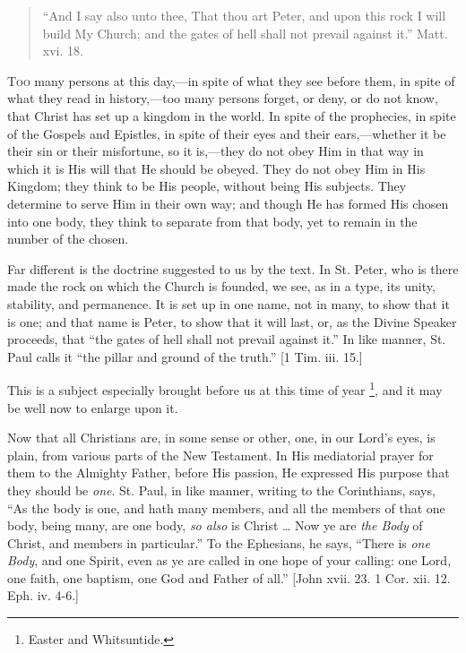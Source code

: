 
\begin{quote}

``And I say also unto thee, That thou art Peter, and upon
this rock I will build My Church; and the gates of hell shall not
prevail against it.'' Matt. xvi. 18.

\end{quote}

T\textsc{oo} many persons at this day,—in spite of what they see before
them, in spite of what they read in history,—too many persons
forget, or deny, or do not know, that Christ has set up a kingdom in
the world. In spite of the prophecies, in spite of the Gospels and
Epistles, in spite of their eyes and their ears,—whether it be their
sin or their misfortune, so it is,—they do not obey Him in that way
in which it is His will that He should be obeyed. They do not obey Him
in His Kingdom; they think to be His people, without being His
subjects. They determine to serve Him in their own way; and though He
has formed His chosen into one body, they think to separate from that
body, yet to remain in the number of the chosen.

Far different is the doctrine suggested to us by the text. In St.
Peter, who is there made the rock on which the Church is founded, we
see, as in a type, its unity, stability, and permanence. It is set up
in one name, not in many, to show that it is one; and that name is
Peter, to show that it will last, or, as the Divine Speaker proceeds,
that ``the gates of hell shall not prevail against it.'' In
like manner, St. Paul calls it ``the pillar and ground of the
truth.'' [1 Tim. iii. 15.]

This is a subject especially brought before us at this time of year
\footnote{Easter and Whitsuntide.}, and it may be well now
to enlarge upon it.

Now that all Christians are, in some sense or other, one, in our
Lord's eyes, is plain, from various parts of the New Testament. In His
mediatorial prayer for them to the Almighty Father, before His
passion, He expressed His purpose that they should be \emph{one}. St.
Paul, in like manner, writing to the Corinthians, says, ``As the
body is one, and hath many members, and all the members of that one
body, being many, are one body, \emph{so also} is Christ … Now ye
are \emph{the Body} of Christ, and members in particular.'' To the
Ephesians, he says, ``There is \emph{one Body}, and one Spirit,
even as ye are called in one hope of your calling: one Lord, one
faith, one baptism, one God and Father of all.'' [John xvii. 23. 1
Cor. xii. 12. Eph. iv. 4-6.]

